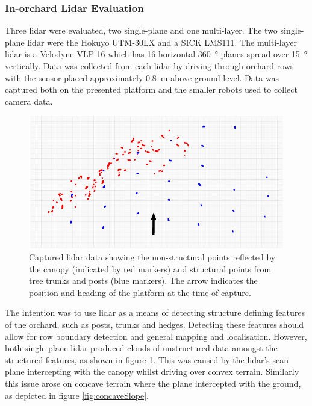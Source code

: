 \documentclass[preprint,authoryear,12pt]{elsarticle}
\begin{document}
    \subsubsection{In-orchard Lidar Evaluation}
        Three lidar were evaluated, two single-plane and one multi-layer.
        The two single-plane lidar were the Hokuyo UTM-30LX and a SICK LMS111.
        The multi-layer lidar is a Velodyne VLP-16 which has 16 horizontal \SI{360}{\degree} planes spread over \SI{15}{\degree} vertically.
        Data was collected from each lidar by driving through orchard rows with the sensor placed approximately \SI{0.8}{\meter} above ground level.
        Data was captured both on the presented platform and the smaller robots used to collect camera data.

        \begin{figure}[htb]
            \centering
            \includegraphics[width=\linewidth]{imgs/canopy_data/canopy_data.pdf}
            \caption{
                Captured lidar data showing the non-structural points reflected by the canopy (indicated by red markers) and structural points from tree trunks and posts (blue markers).
                The arrow indicates the position and heading of the platform at the time of capture.
            }
            \label{fig:canopyDataCloud}
        \end{figure}

        The intention was to use lidar as a means of detecting structure defining features of the orchard, such as posts, trunks and hedges.
        Detecting these features should allow for row boundary detection and general mapping and localisation.
        However, both single-plane lidar produced clouds of unstructured data amongst the structured features, as shown in figure \ref{fig:canopyDataCloud}.
        This was caused by the lidar's scan plane intercepting with the canopy whilst driving over convex terrain.
        Similarly this issue arose on concave terrain where the plane intercepted with the ground, as depicted in figure \ref{fig:concaveSlope}.
\end{document}
